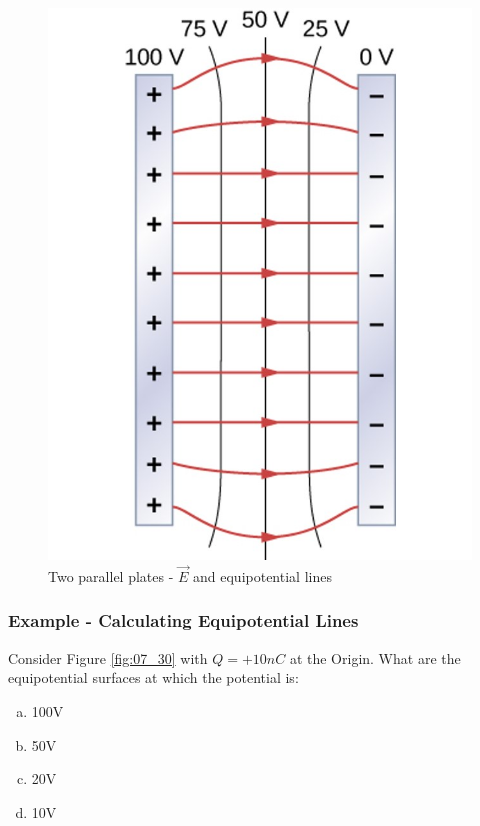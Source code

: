 \documentclass[14pt]{memoir}
\begin{document}
\begin{figure}[H]
\begin{center}
\includegraphics[scale=0.50]{fig/fig_07_35.jpg}
\caption{Two parallel plates - $\vec{E}$ and equipotential lines}
\label{fig:07_35}
\end{center}
\end{figure}

\subsubsection{Example - Calculating Equipotential Lines}

Consider Figure \ref{fig:07_30} with $Q = +10nC$ at the Origin. What are the equipotential surfaces at which the potential is:

\begin{enumerate}[(a)]
\item 100V
\item 50V
\item 20V
\item 10V
\end{enumerate}
\end{document}
